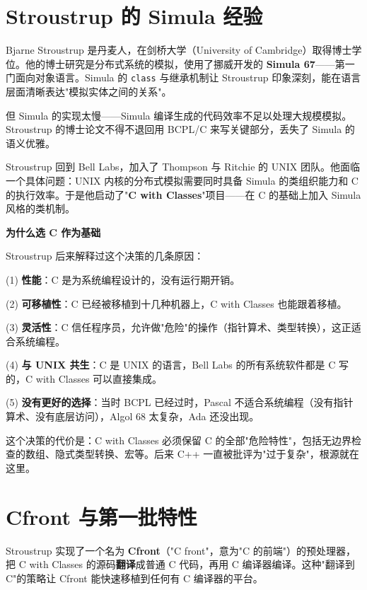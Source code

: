 \documentclass[12pt,a4paper,fontset=fandol]{ctexbook}
\newcommand{\yearlabel}[1]{%
  \tcbox[on line,colback=yearheadbg,colframe=yearheadbg,
    boxrule=0pt,arc=1pt,left=3pt,right=3pt,top=1pt,bottom=1pt,
    colupper=white,fontupper=\scriptsize\bfseries]{#1}}
\newcommand{\kw}[1]{\texttt{#1}}
\newcommand{\yrlbl}[1]{\yearlabel{#1}}
\begin{document}
\section{Stroustrup 的 Simula 经验}

\yrlbl{1975} Bjarne Stroustrup 是丹麦人，在剑桥大学（University of Cambridge）取得博士学位。他的博士研究是分布式系统的模拟，使用了挪威开发的 \textbf{Simula 67}——第一门面向对象语言。Simula 的 \kw{class} 与继承机制让 Stroustrup 印象深刻，能在语言层面清晰表达"模拟实体之间的关系"。

但 Simula 的实现太慢——Simula 编译生成的代码效率不足以处理大规模模拟。Stroustrup 的博士论文不得不退回用 BCPL/C 来写关键部分，丢失了 Simula 的语义优雅。

\yrlbl{1979} Stroustrup 回到 Bell Labs，加入了 Thompson 与 Ritchie 的 UNIX 团队。他面临一个具体问题：UNIX 内核的分布式模拟需要同时具备 Simula 的类组织能力和 C 的执行效率。于是他启动了"\textbf{C with Classes}"项目——在 C 的基础上加入 Simula 风格的类机制。

\begin{historybox}
\textbf{为什么选 C 作为基础}

Stroustrup 后来解释过这个决策的几条原因：

(1) \textbf{性能}：C 是为系统编程设计的，没有运行期开销。

(2) \textbf{可移植性}：C 已经被移植到十几种机器上，C with Classes 也能跟着移植。

(3) \textbf{灵活性}：C 信任程序员，允许做"危险"的操作（指针算术、类型转换），这正适合系统编程。

(4) \textbf{与 UNIX 共生}：C 是 UNIX 的语言，Bell Labs 的所有系统软件都是 C 写的，C with Classes 可以直接集成。

(5) \textbf{没有更好的选择}：当时 BCPL 已经过时，Pascal 不适合系统编程（没有指针算术、没有底层访问），Algol 68 太复杂，Ada 还没出现。

这个决策的代价是：C with Classes 必须保留 C 的全部"危险特性"，包括无边界检查的数组、隐式类型转换、宏等。后来 C++ 一直被批评为"过于复杂"，根源就在这里。
\end{historybox}

\section{Cfront 与第一批特性}

\yrlbl{1979-1983} Stroustrup 实现了一个名为 \textbf{Cfront}（"C front"，意为"C 的前端"）的预处理器，把 C with Classes 的源码\textbf{翻译}成普通 C 代码，再用 C 编译器编译。这种"翻译到 C"的策略让 Cfront 能快速移植到任何有 C 编译器的平台。
\end{document}
